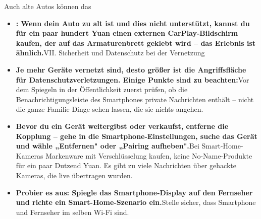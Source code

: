 
Auch alte Autos können das

\begin{itemize}
  \item \textbf{: Wenn dein Auto zu alt ist und dies nicht unterstützt, kannst du für ein paar hundert Yuan einen externen CarPlay-Bildschirm kaufen, der auf das Armaturenbrett geklebt wird – das Erlebnis ist ähnlich.}VII. Sicherheit und Datenschutz bei der Vernetzung
  \item \textbf{Je mehr Geräte vernetzt sind, desto größer ist die Angriffsfläche für Datenschutzverletzungen. Einige Punkte sind zu beachten:}Vor dem Spiegeln in der Öffentlichkeit zuerst prüfen, ob die Benachrichtigungsleiste des Smartphones private Nachrichten enthält – nicht die ganze Familie Dinge sehen lassen, die sie nichts angehen.
  \item \textbf{Bevor du ein Gerät weitergibst oder verkaufst, entferne die Kopplung – gehe in die Smartphone-Einstellungen, suche das Gerät und wähle „Entfernen" oder „Pairing aufheben".}Bei Smart-Home-Kameras Markenware mit Verschlüsselung kaufen, keine No-Name-Produkte für ein paar Dutzend Yuan. Es gibt zu viele Nachrichten über gehackte Kameras, die live übertragen wurden.
  \item \textbf{Probier es aus: Spiegle das Smartphone-Display auf den Fernseher und richte ein Smart-Home-Szenario ein.}Stelle sicher, dass Smartphone und Fernseher im selben Wi-Fi sind.
\end{itemize}

